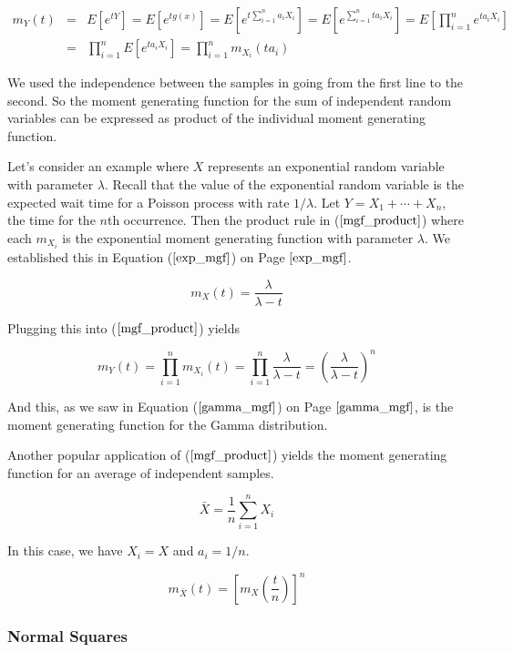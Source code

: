 \documentclass[]{article}
\begin{document}
\begin{eqnarray}
m_Y(t) &= & E \left[ e^{tY} \right] 
  =  E \left[ e^{tg(x)} \right] 
  = E \left[ e^{t \sum_{i=1}^n a_i X_i} \right]
  = E \left[ e^{\sum_{i=1}^n t a_i X_i} \right]
  = E \left[ \prod_{i=1}^n e^{t a_i X_i} \right] \nonumber \\
  &= & \prod_{i=1}^n E \left[ e^{t a_i X_i} \right]
  = \prod_{i=1}^n m_{X_i}(t a_i) \label{mgf_product}
\end{eqnarray}

We used the independence between the samples in going from the
first line to the second.
So the moment generating function for the sum of independent 
random variables can be expressed as product of the individual
moment generating function.

Let's consider an example where $X$ represents an exponential
random variable with parameter $\lambda$.  Recall that the
value of the exponential random variable is the expected wait
time for a Poisson process with rate $1/\lambda$.  Let
$Y = X_1 + \cdots + X_n$, the time for the $n$th occurrence.
Then the product rule in ($\ref{mgf_product}$) where each
$m_{X_i}$ is the exponential moment generating function with
parameter $\lambda$.  We established this in
Equation ($\ref{exp_mgf}$) on Page $\pageref{exp_mgf}$.

$$
m_X(t) = \frac{\lambda}{\lambda - t}
$$

Plugging this into ($\ref{mgf_product}$) yields

$$
m_Y(t) = \prod_{i=1}^n m_{X_i}(t)
  = \prod_{i=1}^n \frac{\lambda}{\lambda - t}
  = \left( \frac{\lambda}{\lambda - t} \right)^n
$$

And this, as we saw in Equation ($\ref{gamma_mgf}$) on
Page $\pageref{gamma_mgf}$, is the moment generating
function for the Gamma distribution.

Another popular application of ($\ref{mgf_product}$)
yields the moment generating function for an average of
independent samples.

$$
\bar{X} = \frac{1}{n} \sum_{i=1}^n X_i
$$

In this case, we have $X_i = X$ and $a_i = 1/n$.

\begin{equation}
m_{\bar{X}}(t) = \left[ m_X \left( \frac{t}{n} \right) \right]^n
\end{equation}

\subsubsection{Normal Squares}
\end{document}
